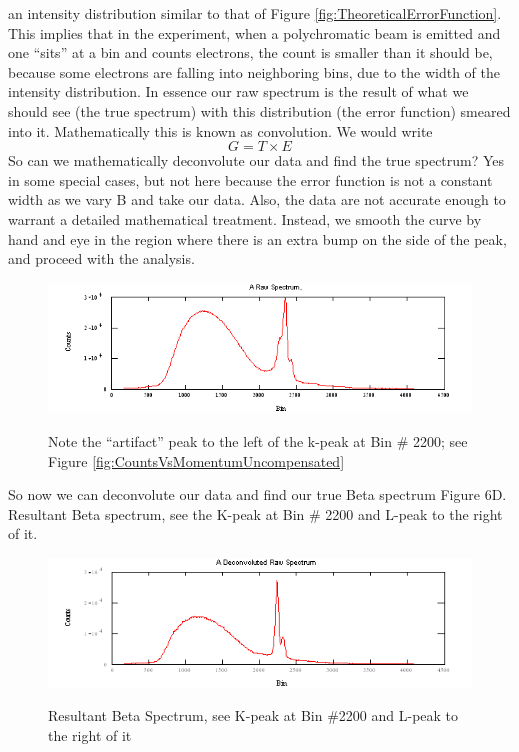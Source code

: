 \documentclass{../lab}
\begin{document}
an intensity distribution similar to that of Figure \ref{fig:TheoreticalErrorFunction}. This implies that in the experiment, when a polychromatic beam is emitted and one ``sits'' at a bin and counts electrons, the count is smaller than it should be, because some electrons are falling into neighboring bins, due to the width of the intensity distribution. In essence our raw spectrum is the result of what we should see (the true spectrum) with this distribution (the error function) smeared into it. Mathematically this is known as convolution. We would write
\[
G = T \times E
\]
So can we mathematically deconvolute our data and find the true spectrum? Yes in some special cases, but not here because the error function is not a constant width as we vary B and take our data. Also, the data are not accurate enough to warrant a detailed mathematical treatment. Instead, we smooth the curve by hand and eye in the region where there is an extra bump on the side of the peak, and proceed with the analysis.

\begin{figure}[h]
    \centering
    \href{http://experimentationlab.berkeley.edu/sites/default/files/images/BRAimage041.gif}{\includegraphics[width=0.5\linewidth]{images/BRAimage041.png}}
    \caption{Note the ``artifact'' peak to the left of the k-peak at Bin \# 2200; see Figure \ref{fig:CountsVsMomentumUncompensated}}
    \label{fig:RawSpectrum}
\end{figure}

So now we can deconvolute our data and find our true Beta spectrum Figure 6D. Resultant Beta spectrum, see the K-peak at Bin \# 2200 and L-peak to the right of it.

\begin{figure}[h]
    \centering
    \href{http://experimentationlab.berkeley.edu/sites/default/files/images/BRAimage042.gif}{\includegraphics[width=0.5\linewidth]{images/BRAimage042.png}}
    \caption{Resultant Beta Spectrum, see K-peak at Bin \#2200 and L-peak to the right of it}
    \label{fig:DeconvolutedRawSpectrum}
\end{figure}
\end{document}
